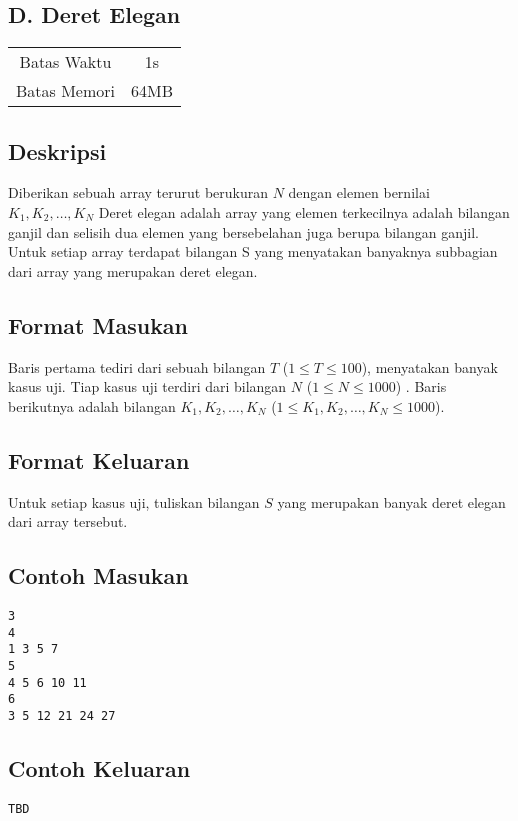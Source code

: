 \documentclass{article}
\begin{document}
\begin{center}
    \section*{D. Deret Elegan} %

    \begin{tabular}{ | c c | }
        \hline
        Batas Waktu  & 1s \\    %
        Batas Memori & 64MB \\  %
        \hline
    \end{tabular}
\end{center}

\subsection*{Deskripsi}


Diberikan sebuah array terurut berukuran $N$ dengan elemen bernilai $K_1,K_2,\dots,K_N$
Deret elegan adalah array yang elemen terkecilnya adalah bilangan ganjil dan selisih dua elemen yang bersebelahan juga berupa bilangan ganjil.
Untuk setiap array terdapat bilangan S yang menyatakan banyaknya subbagian dari array yang merupakan deret elegan.

\subsection*{Format Masukan}

Baris pertama tediri dari sebuah bilangan $T$ ($1 \leq T \leq 100$), menyatakan banyak kasus uji.
Tiap kasus uji terdiri dari bilangan $N$ ($1 \leq N \leq 1000$) .
Baris berikutnya adalah bilangan $K_1,K_2,\dots,K_N$ ($1 \leq K_1,K_2,\dots,K_N \leq 1000$).

\subsection*{Format Keluaran}

Untuk setiap kasus uji, tuliskan bilangan $S$ yang merupakan banyak deret elegan dari array tersebut.



\begin{multicols}{2}
\subsection*{Contoh Masukan}
\begin{lstlisting}
3
4 
1 3 5 7
5
4 5 6 10 11
6
3 5 12 21 24 27
\end{lstlisting}
\columnbreak
\subsection*{Contoh Keluaran}
\begin{lstlisting}
TBD
\end{lstlisting}
\vfill
\null
\end{multicols}




\pagebreak
\end{document}
